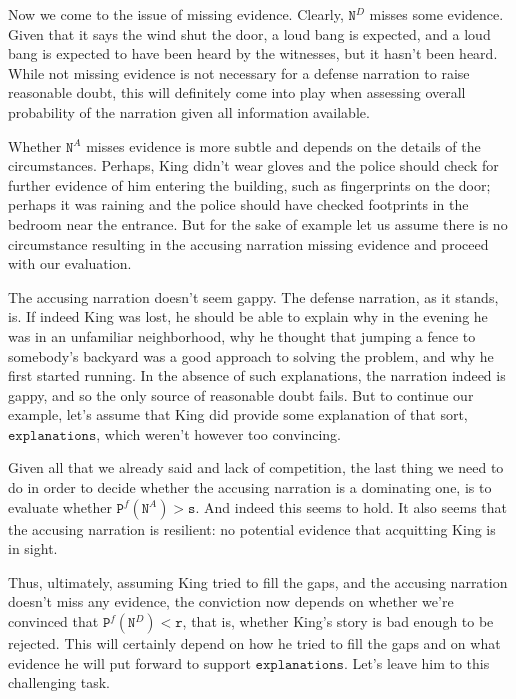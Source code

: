 \documentclass[10pt,leqno]{article}
\begin{document}
Now we come to the issue of missing evidence. Clearly, $\mathtt{N}^D$ misses some evidence. Given that it says the wind shut the door, a loud bang is expected, and a loud bang is expected to have been heard by the witnesses, but it hasn't been heard. While not missing evidence is not  necessary for a defense narration to raise reasonable doubt, this will definitely come into play when assessing overall probability of the narration given all information available.

  Whether $\mathtt{N}^A$ misses evidence is more subtle and depends on the details of the circumstances. Perhaps, King didn't wear gloves and the police should check for further evidence of him entering the building, such as fingerprints on the door; perhaps it was raining and the police should have checked footprints in the bedroom near the entrance. But for the sake of example let us assume there is  no circumstance resulting in the accusing narration missing evidence and proceed with our evaluation. 

The accusing narration doesn't seem gappy.  The defense narration, as it stands, is. If indeed King was lost, he should be  able to explain why in the evening  he was in an unfamiliar neighborhood, why he thought that jumping a fence to somebody's backyard was a good approach to solving the problem, and why he first started running. In the absence of such explanations, the narration indeed is gappy, and so the only source of reasonable doubt fails. But to continue our example, let's assume that King did provide some explanation of that sort, $\mathtt{explanations}$, which weren't however too convincing.



Given all that we already said and lack of competition, the last thing we need to do  in order to decide whether the accusing narration  is a dominating one, is to evaluate whether $\mathtt{P}^f(\mathtt{N}^A)>\mathtt{s}$. And indeed this seems to hold. It also seems  that the accusing narration is resilient: no potential  evidence that acquitting King is in sight.

Thus, ultimately, assuming King tried to fill the gaps, and the accusing narration doesn't miss any evidence,  the conviction now depends on whether we're convinced that $\mathtt{P}^f(\mathtt{N}^D)<\mathtt{r}$, that is, whether King's story is bad enough to be rejected. This will certainly depend on how he tried to fill the gaps and on what evidence he will put forward to support $\mathtt{explanations}$. Let's leave him to this challenging task.
\end{document}
